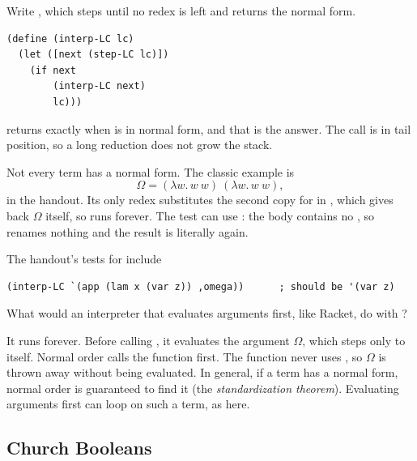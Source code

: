 \begin{exercise}
Write , which steps until no redex is left and returns the normal form.
\end{exercise}
\begin{solution}
\begin{lstlisting}
(define (interp-LC lc)
  (let ([next (step-LC lc)])
    (if next
        (interp-LC next)
        lc)))
\end{lstlisting}
 returns  exactly when  is in normal form, and that is the answer. The call is in tail position, so a long reduction does not grow the stack.
\end{solution}

Not every term has a normal form. The classic example is
\[
\Omega = (\lambda w.\, w\ w)\ (\lambda w.\, w\ w),
\]
 in the handout. Its only redex substitutes the second copy for  in , which gives back $\Omega$ itself, so  runs forever. The test  can use : the body  contains no , so  renames nothing and the result is literally  again.

The handout's tests for  include
\begin{lstlisting}
(interp-LC `(app (lam x (var z)) ,omega))      ; should be '(var z)
\end{lstlisting}

\begin{exercise}[Discussion]
What would an interpreter that evaluates arguments first, like Racket, do with ?
\end{exercise}
\begin{solution}
It runs forever. Before calling , it evaluates the argument $\Omega$, which steps only to itself. Normal order calls the function first. The function never uses , so $\Omega$ is thrown away without being evaluated. In general, if a term has a normal form, normal order is guaranteed to find it (the \emph{standardization theorem}). Evaluating arguments first can loop on such a term, as here.
\end{solution}

\subsection{Church Booleans}

